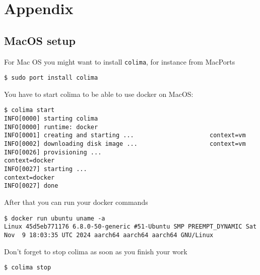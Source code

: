 \documentclass[14pt,a4paper]{article}
\begin{document}
\section{Appendix}
\subsection{MacOS setup}
For Mac OS you might want to install \texttt{colima}, for instance
from MacPorts
\begin{verbatim}
$ sudo port install colima
\end{verbatim}

You have to start colima to be able to use docker on MacOS:
\begin{verbatim}
$ colima start
INFO[0000] starting colima
INFO[0000] runtime: docker
INFO[0001] creating and starting ...                     context=vm
INFO[0002] downloading disk image ...                    context=vm
INFO[0026] provisioning ...                              context=docker
INFO[0027] starting ...                                  context=docker
INFO[0027] done                                                 
\end{verbatim}

After that you can run your docker commands
\begin{verbatim}
$ docker run ubuntu uname -a  
Linux 45d5eb771176 6.8.0-50-generic #51-Ubuntu SMP PREEMPT_DYNAMIC Sat Nov  9 18:03:35 UTC 2024 aarch64 aarch64 aarch64 GNU/Linux
\end{verbatim}

Don't forget to stop colima as soon as you finish your work
\begin{verbatim}
$ colima stop
\end{verbatim}

  
     
\end{document}
